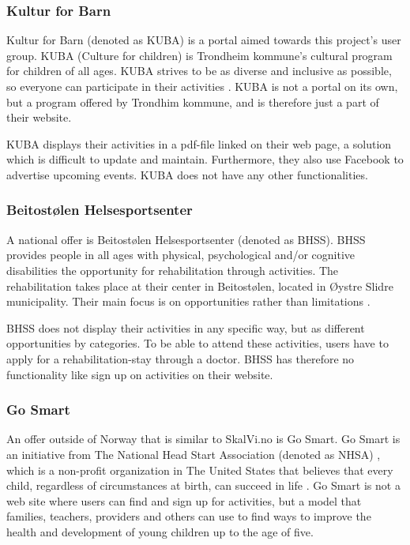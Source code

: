\subsubsection{Kultur for Barn}
Kultur for Barn (denoted as KUBA) is a portal aimed towards this project's user group. KUBA (Culture for children) is Trondheim kommune's cultural program for children of all ages. KUBA strives to be as diverse and inclusive as possible, so everyone can participate in their activities \cite{KUBA}. KUBA is not a portal on its own, but a program offered by Trondhim kommune, and is therefore just a part of their website. 

KUBA displays their activities in a pdf-file linked on their web page, a solution which is difficult to update and maintain. Furthermore, they also use Facebook to advertise upcoming events. KUBA does not have any other functionalities.

\subsubsection{Beitostølen Helsesportsenter}
A national offer is Beitostølen Helsesportsenter (denoted as BHSS). BHSS provides people in all ages with physical, psychological and/or cognitive disabilities the opportunity for rehabilitation through activities. The rehabilitation takes place at their center in Beitostølen, located in Øystre Slidre municipality. Their main focus is on opportunities rather than limitations \cite{BHSS}.  

BHSS does not display their activities in any specific way, but as different opportunities by categories. To be able to attend these activities, users have to apply for a rehabilitation-stay through a doctor. BHSS has therefore no functionality like sign up on activities on their website.  

\subsubsection{Go Smart}
An offer outside of Norway that is similar to SkalVi.no is Go Smart. Go Smart is an initiative from The National Head Start Association (denoted as NHSA) \cite{NHSA}, which is a non-profit organization in The United States that believes that every child, regardless of circumstances at birth, can succeed in life \cite{GoSart}. Go Smart is not a web site where users can find and sign up for activities, but a model that families, teachers, providers and others can use to find ways to improve the health and development of young children up to the age of five.

